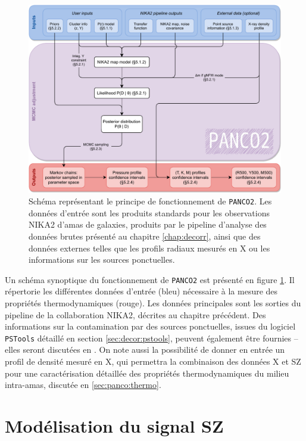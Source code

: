 \begin{figure}[t]
    \centering
    \includegraphics[width=.9\linewidth]{Figures/Chap_panco/panco2_workflow.pdf}
    \caption{
        Schéma représentant le principe de fonctionnement de \texttt{PANCO2}.
        Les données d'entrée sont les produits standards pour les observations NIKA2 d'amas de galaxies, produits par le pipeline d'analyse des données brutes présenté au chapitre \ref{chap:decorr}, ainsi que des données externes telles que les profils radiaux mesurés en X ou les informations sur les sources ponctuelles.
    }
    \label{fig:panco:schema}
\end{figure}

Un schéma synoptique du fonctionnement de \texttt{PANCO2} est présenté en figure \ref{fig:panco:schema}.
Il répertorie les différentes données d'entrée (bleu) nécessaire à la mesure des propriétés thermodynamiques (rouge).
Les données principales sont les sorties du pipeline de la collaboration NIKA2, décrites au chapitre précédent.
Des informations sur la contamination par des sources ponctuelles, issues du logiciel \texttt{PSTools} détaillé en section \ref{sec:decor:pstools}, peuvent également être fournies -- elles seront discutées en .
On note aussi la possibilité de donner en entrée un profil de densité mesuré en X, qui permettra la combinaison des données X et SZ pour une caractérisation détaillée des propriétés thermodynamiques du milieu intra-amas, discutée en \ref{sec:panco:thermo}.

\section{Modélisation du signal SZ}


